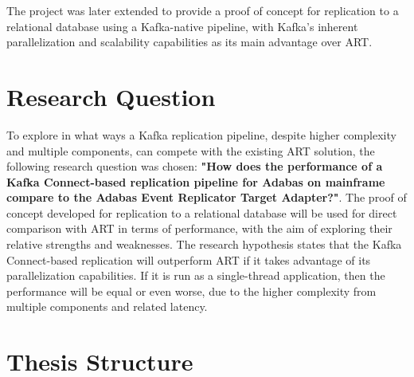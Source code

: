 The project was later extended to provide a proof of concept for replication to a relational database using a Kafka-native pipeline, with Kafka's inherent parallelization and scalability capabilities \cite{peddireddy2023kafkadatalakebenefits} as its main advantage over \ac{ART}.

\section{Research Question}
\label{ch01:intro:researchquestion}
To explore in what ways a Kafka replication pipeline, despite higher complexity and multiple components, can compete with the existing \ac{ART} solution, the following research question was chosen: \textbf{"How does the performance of a Kafka Connect-based replication pipeline for Adabas on mainframe compare to the Adabas Event Replicator Target Adapter?"}. The proof of concept developed for replication to a relational database will be used for direct comparison with \ac{ART} in terms of performance, with the aim of exploring their relative strengths and weaknesses. The research hypothesis states that the Kafka Connect-based replication will outperform \ac{ART} if it takes advantage of its parallelization capabilities. If it is run as a single-thread application, then the performance will be equal or even worse, due to the higher complexity from multiple components and related latency.

\section{Thesis Structure}
\label{ch01:intro:thesisstructure}